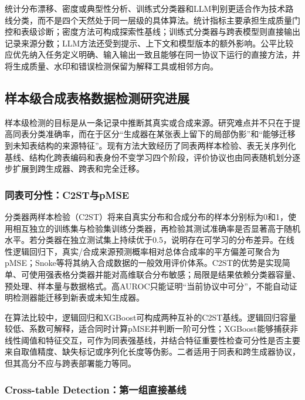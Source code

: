 \documentclass[
  chinese,
  12pt,
  a4paper,
  chinese,
  UTF8]{ctexart}
\begin{document}
统计分布漂移、密度或典型性分析、训练式分类器和LLM判别更适合作为技术路线分类，而不是四个天然处于同一层级的具体算法。统计指标主要承担生成质量门控和表级诊断；密度方法可构成探索性基线；训练式分类器与跨表模型则直接输出记录来源分数；LLM方法还受到提示、上下文和模型版本的额外影响。公平比较应优先纳入任务定义明确、输入输出一致且能够在同一协议下运行的直接方法，并将生成质量、水印和错误检测保留为解释工具或相邻方向。

\subsection{样本级合成表格数据检测研究进展}\label{ux6837ux672cux7ea7ux5408ux6210ux8868ux683cux6570ux636eux68c0ux6d4bux7814ux7a76ux8fdbux5c55}

样本级检测的目标是从一条记录中推断其真实或合成来源。研究难点并不只在于提高同表分类准确率，而在于区分``生成器在某张表上留下的局部伪影''和``能够迁移到未知表结构的来源特征''。现有方法大致经历了同表两样本检验、表无关序列化基线、结构化跨表编码和表身份不变学习四个阶段，评价协议也由同表随机划分逐步扩展到跨生成器、跨表和完全迁移。

\subsubsection{同表可分性：C2ST与pMSE}\label{ux540cux8868ux53efux5206ux6027c2stux4e0epmse}

分类器两样本检验（C2ST）将来自真实分布和合成分布的样本分别标为0和1，使用相互独立的训练集与检验集训练分类器，再检验其测试准确率是否显著高于随机水平\autocite{lopezpaz2017c2st}。若分类器在独立测试集上持续优于0.5，说明存在可学习的分布差异。在线性逻辑回归下，真实/合成来源预测概率相对总体合成率的平方偏差可聚合为pMSE；Snoke等将其纳入合成数据的一般效用评价体系\autocite{snoke2018pmse}。C2ST的优势是实现简单、可使用强表格分类器并能对高维联合分布敏感；局限是结果依赖分类器容量、预处理、样本量与数据格式。高AUROC只能证明``当前协议中可分''，不能自动证明检测器能迁移到新表或未知生成器。

在算法比较中，逻辑回归和XGBoost可构成两种互补的C2ST基线。逻辑回归容量较低、系数可解释，适合同时计算pMSE并判断一阶可分性；XGBoost能够捕获非线性阈值和特征交互，可作为同表强基线，并结合特征重要性检查可分性是否主要来自取值精度、缺失标记或序列化长度等伪影。二者适用于同表和跨生成器协议，但其高分不应与跨表部署能力等同。

\subsubsection{Cross-table
Detection：第一组直接基线}\label{cross-table-detectionux7b2cux4e00ux7ec4ux76f4ux63a5ux57faux7ebf}
\end{document}
